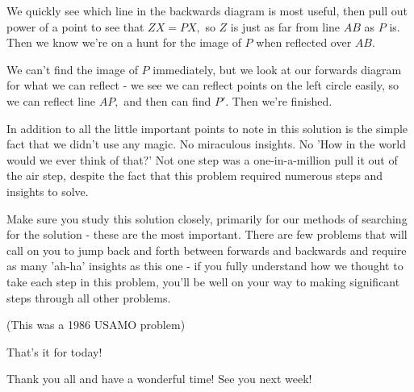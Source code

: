We quickly see which line in the backwards diagram is most useful, then pull out power of a point to see that $ZX = PX,$ so $Z$ is just as far from line $AB$ as $P$ is. Then we know we're on a hunt for the image of $P$ when reflected over $AB.$

We can't find the image of $P$ immediately, but we look at our forwards diagram for what we can reflect - we see we can reflect points on the left circle easily, so we can reflect line $AP,$ and then can find $P'.$ Then we're finished.

In addition to all the little important points to note in this solution is the simple fact that we didn't use any magic. No miraculous insights. No 'How in the world would we ever think of that?'  Not one step was a one-in-a-million pull it out of the air step, despite the fact that this problem required numerous steps and insights to solve.

\begin{remark}
Make sure you study this solution closely, primarily for our methods of searching for the solution - these are the most important. There are few problems that will call on you to jump back and forth between forwards and backwards and require as many 'ah-ha' insights as this one - if you fully understand how we thought to take each step in this problem, you'll be well on your way to making significant steps through all other problems.
    
\end{remark}



\begin{remark}
    (This was a 1986 USAMO problem)    
\end{remark}

That's it for today! 

Thank you all and have a wonderful time! See you next week!

